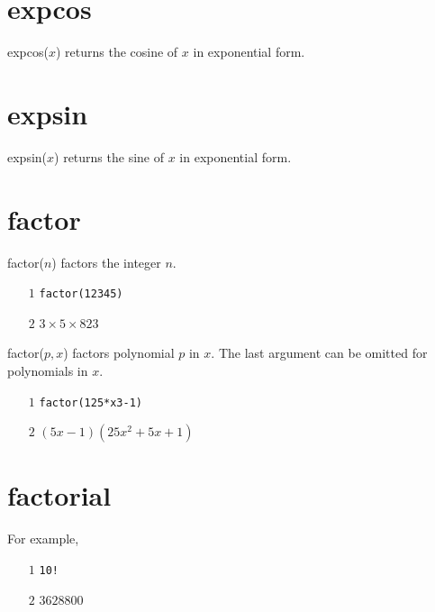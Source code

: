 \documentclass[12pt,openany]{report}
\begin{document}
\section*{expcos}
expcos($x$) returns the cosine of $x$ in exponential form.

\section*{expsin}
expsin($x$) returns the sine of $x$ in exponential form.

\section*{factor}
factor($n$) factors the integer $n$.
\begin{itemize}
\item[$\scriptstyle1$]{\tt factor(12345)}
\item[$\scriptstyle2$]\hspace{50pt} $3\times 5\times 823$
\end{itemize}
%
factor($p,x$) factors polynomial $p$ in $x$.
The last argument can be omitted for polynomials in $x$.
\begin{itemize}
\item[$\scriptstyle1$]{\tt factor(125*x{}3-1)}
\item[$\scriptstyle2$]\hspace{50pt} $(5x-1)(25x^2+5x+1)$
\end{itemize}

\section*{factorial}
For example,
\begin{itemize}
\item[$\scriptstyle1$]{\tt 10!}
\item[$\scriptstyle2$]\hspace{50pt} $3628800$
\end{itemize}
\end{document}
